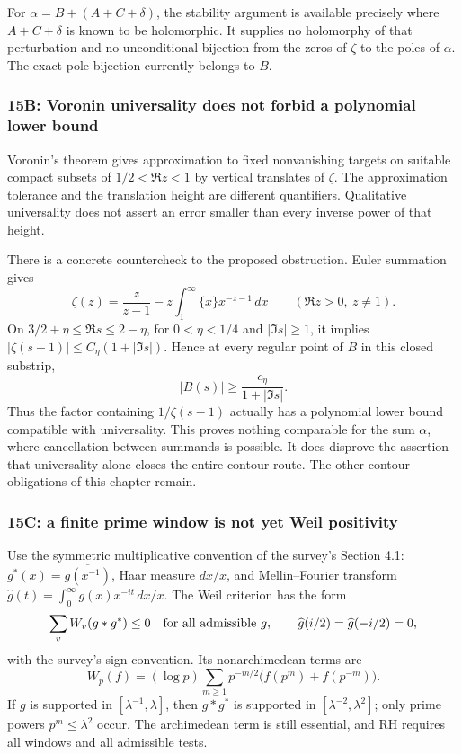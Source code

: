 For $\alpha=B+(A+C+\delta)$, the stability argument is available precisely
where $A+C+\delta$ is known to be holomorphic.
It supplies no holomorphy of that perturbation and no unconditional
bijection from the zeros of $\zeta$ to the poles of $\alpha$.
The exact pole bijection currently belongs to $B$.

\subsubsection{15B: Voronin universality does not forbid a polynomial lower bound}
\label{subsubsec:a12-universality}
Voronin's theorem gives approximation to fixed nonvanishing targets on
suitable compact subsets of $1/2<\Re z<1$ by vertical translates of
$\zeta$. The approximation tolerance and the translation height are
different quantifiers. Qualitative universality does not assert an
error smaller than every inverse power of that height.

There is a concrete countercheck to the proposed obstruction. Euler
summation gives
\begin{equation}
\label{eq:a12-zeta-elementary}
\zeta(z)=\frac{z}{z-1}
-z\int_1^\infty \{x\}x^{-z-1}\,dx\qquad(\Re z>0,\ z\ne1).
\end{equation}
On $3/2+\eta\le\Re s\le2-\eta$, for $0<\eta<1/4$ and $|\Im s|\ge1$,
it implies $|\zeta(s-1)|\le C_\eta(1+|\Im s|)$. Hence at every regular
point of $B$ in this closed substrip,
\begin{equation}
\label{eq:a12-B-lower}
\boxed{|B(s)|\ge\frac{c_\eta}{1+|\Im s|}.}
\end{equation}
Thus the factor containing $1/\zeta(s-1)$ actually has a polynomial
lower bound compatible with universality. This proves nothing comparable
for the sum $\alpha$, where cancellation between summands is possible.
It does disprove the assertion that universality alone closes the entire
contour route. The other contour obligations of this chapter remain.

\subsubsection{15C: a finite prime window is not yet Weil positivity}
\label{subsubsec:a12-Weil-window}
Use the symmetric multiplicative convention of the survey's Section 4.1:
$g^*(x)=\overline{g(x^{-1})}$, Haar measure $dx/x$, and Mellin--Fourier
transform $\widehat g(t)=\int_0^\infty g(x)x^{-it}\,dx/x$.
The Weil criterion has the form
\begin{equation}
\label{eq:a12-Weil}
\sum_v W_v(g*g^*)\le0
\quad\hbox{for all admissible }g,\qquad
\widehat g(i/2)=\widehat g(-i/2)=0,
\end{equation}
with the survey's sign convention. Its nonarchimedean terms are
\begin{equation}
\label{eq:a12-Weil-primes}
W_p(f)=(\log p)\sum_{m\ge1}p^{-m/2}
\bigl(f(p^m)+f(p^{-m})\bigr).
\end{equation}
If $g$ is supported in $[\lambda^{-1},\lambda]$, then $g*g^*$ is
supported in $[\lambda^{-2},\lambda^2]$; only prime powers
$p^m\le\lambda^2$ occur. The archimedean term is still essential, and
RH requires all windows and all admissible tests.


